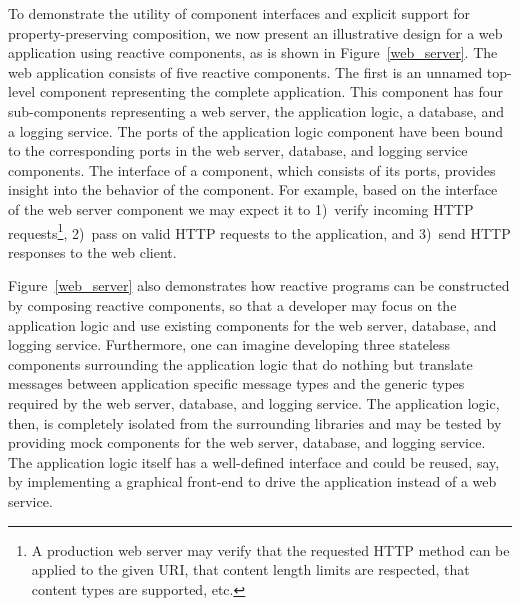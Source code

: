 To demonstrate the utility of component interfaces and explicit support for property-preserving composition, we now present an illustrative design for a web application using reactive components, as is shown in Figure~\ref{web_server}.
The web application consists of five reactive components.
The first is an unnamed top-level component representing the complete application.
This component has four sub-components representing a web server, the application logic, a database, and a logging service.
The ports of the application logic component have been bound to the corresponding ports in the web server, database, and logging service components.
The interface of a component, which consists of its ports, provides insight into the behavior of the component.
For example, based on the interface of the web server component we may expect it to 1)~verify incoming HTTP requests\footnote{A production web server may verify that the requested HTTP method can be applied to the given URI, that content length limits are respected, that content types are supported, etc.}, 2)~pass on valid HTTP requests to the application, and 3)~send HTTP responses to the web client.

Figure~\ref{web_server} also demonstrates how reactive programs can be constructed by composing reactive components, so that a developer may focus on the application logic and use existing components for the web server, database, and logging service.
Furthermore, one can imagine developing three stateless components surrounding the application logic that do nothing but translate messages between application specific message types and the generic types required by the web server, database, and logging service.
The application logic, then, is completely isolated from the surrounding libraries and may be tested by providing mock components for the web server, database, and logging service.
The application logic itself has a well-defined interface and could be reused, say, by implementing a graphical front-end to drive the application instead of a web service.

